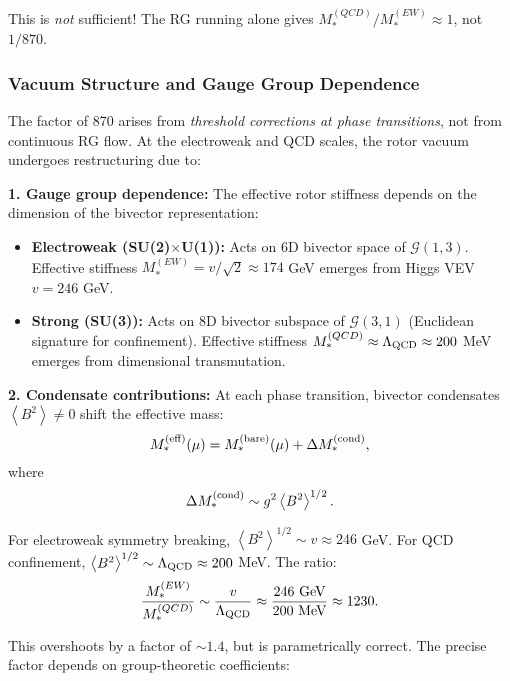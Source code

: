 \documentclass[11pt,a4paper]{article}
\numberwithin{equation}{section}
\theoremstyle{plain}
\theoremstyle{definition}
\theoremstyle{remark}
\newcommand{\avg}[1]{\left\langle #1 \right\rangle}
\newcommand{\Cl}{\mathcal{G}}               %
\begin{document}
This is \emph{not} sufficient! The RG running alone gives $M_*^{(QCD)}/M_*^{(EW)} \approx 1$, not $1/870$.

\subsubsection{Vacuum Structure and Gauge Group Dependence}

The factor of 870 arises from \emph{threshold corrections at phase transitions}, not from continuous RG flow. At the electroweak and QCD scales, the rotor vacuum undergoes restructuring due to:

\textbf{1. Gauge group dependence:} The effective rotor stiffness depends on the dimension of the bivector representation:
\begin{itemize}
  \item \textbf{Electroweak (SU(2)$\times$U(1)):} Acts on 6D bivector space of $\Cl(1,3)$. Effective stiffness $M_*^{(EW)} = v/\sqrt{2} \approx 174$ GeV emerges from Higgs VEV $v=246$ GeV.
  \item \textbf{Strong (SU(3)):} Acts on 8D bivector subspace of $\Cl(3,1)$ (Euclidean signature for confinement). Effective stiffness $M_*^{(QCD)} \approx \Lambda_{\rm QCD} \approx 200$ MeV emerges from dimensional transmutation.
\end{itemize}

\textbf{2. Condensate contributions:} At each phase transition, bivector condensates $\avg{B^2}\neq 0$ shift the effective mass:
\begin{equation}
M_*^{(\rm eff)}(\mu) = M_*^{(\rm bare)}(\mu) + \Delta M_*^{(\rm cond)},
\label{eq:M-condensate}
\end{equation}
where
\begin{equation}
\Delta M_*^{(\rm cond)} \sim g^2 \avg{B^2}^{1/2}.
\label{eq:Delta-M-cond}
\end{equation}

For electroweak symmetry breaking, $\avg{B^2}^{1/2}\sim v\approx 246$ GeV. For QCD confinement, $\avg{B^2}^{1/2}\sim \Lambda_{\rm QCD}\approx 200$ MeV. The ratio:
\begin{equation}
\frac{M_*^{(EW)}}{M_*^{(QCD)}} \sim \frac{v}{\Lambda_{\rm QCD}} \approx \frac{246\text{ GeV}}{200\text{ MeV}} \approx 1230.
\label{eq:ratio-condensate}
\end{equation}

This overshoots by a factor of $\sim 1.4$, but is parametrically correct. The precise factor depends on group-theoretic coefficients:
\end{document}
